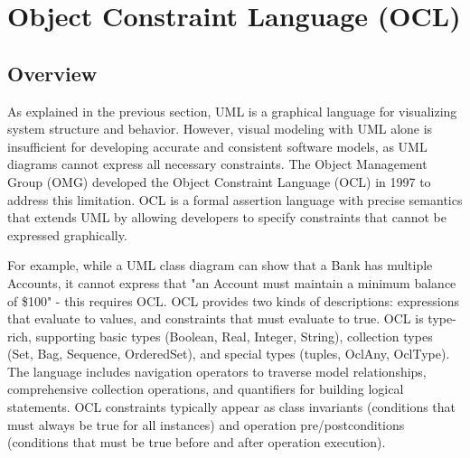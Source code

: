 \section{Object Constraint Language (OCL)}

\subsection{Overview}

\hspace{1cm} As explained in the previous section, UML is a graphical language for 
visualizing system structure and behavior. However, visual modeling with UML alone 
is insufficient for developing accurate and consistent software models, as UML 
diagrams cannot express all necessary constraints. The Object Management Group (OMG) 
developed the Object Constraint Language (OCL) in 1997 to address this limitation. 
OCL is a formal assertion language with precise semantics that extends UML by 
allowing developers to specify constraints that cannot be expressed graphically. 

For example, while a UML class diagram can show that a Bank has multiple Accounts, 
it cannot express that "an Account must maintain a minimum balance of 
\$100" - this requires OCL. OCL provides two kinds of descriptions: expressions 
that evaluate to values, and constraints that must evaluate to true. 
OCL is type-rich, supporting basic types (Boolean, Real, Integer, String), 
collection types (Set, Bag, Sequence, OrderedSet), and special types (tuples, 
OclAny, OclType). The language includes navigation operators to traverse model 
relationships, comprehensive collection operations, and quantifiers for building 
logical statements. OCL constraints typically appear as class invariants 
(conditions that must always be true for all instances) and operation 
pre/postconditions (conditions that must be true before and after operation execution).


